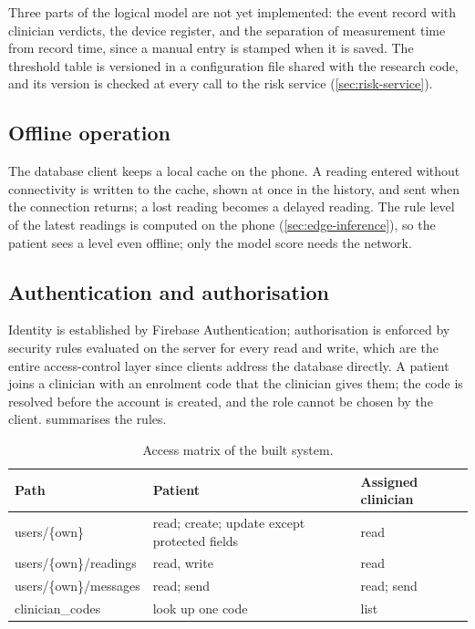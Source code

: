 Three parts of the logical model are not yet implemented: the event record with clinician verdicts, the device register, and the separation of measurement time from record time, since a manual entry is stamped when it is saved. The threshold table is versioned in a configuration file shared with the research code, and its version is checked at every call to the risk service (\cref{sec:risk-service}).

\subsection{Offline operation}\label{sec:offline-built}

The database client keeps a local cache on the phone. A reading entered without connectivity is written to the cache, shown at once in the history, and sent when the connection returns; a lost reading becomes a delayed reading. The rule level of the latest readings is computed on the phone (\cref{sec:edge-inference}), so the patient sees a level even offline; only the model score needs the network.

\subsection{Authentication and authorisation}\label{sec:auth}\label{sec:roles}\label{sec:rules}\label{sec:write-validation}

Identity is established by Firebase Authentication; authorisation is enforced by security rules evaluated on the server for every read and write, which are the entire access-control layer since clients address the database directly. A patient joins a clinician with an enrolment code that the clinician gives them; the code is resolved before the account is created, and the role cannot be chosen by the client.  summarises the rules.

\begin{table}[htbp]
\centering\footnotesize
\caption{Access matrix of the built system.}\label{tab:access-matrix}
\begin{tabularx}{\textwidth}{@{}>{\raggedright\arraybackslash\ttfamily\scriptsize}p{3.6cm} >{\raggedright\arraybackslash}X >{\raggedright\arraybackslash}X@{}}
\toprule
\normalfont\textbf{Path} & \textbf{Patient} & \textbf{Assigned clinician} \\
\midrule
users/\{own\} & read; create; update except protected fields & read \\
users/\{own\}/readings & read, write & read \\
users/\{own\}/messages & read; send & read; send \\
clinician\_codes & look up one code & list \\
\bottomrule
\end{tabularx}
\end{table}

